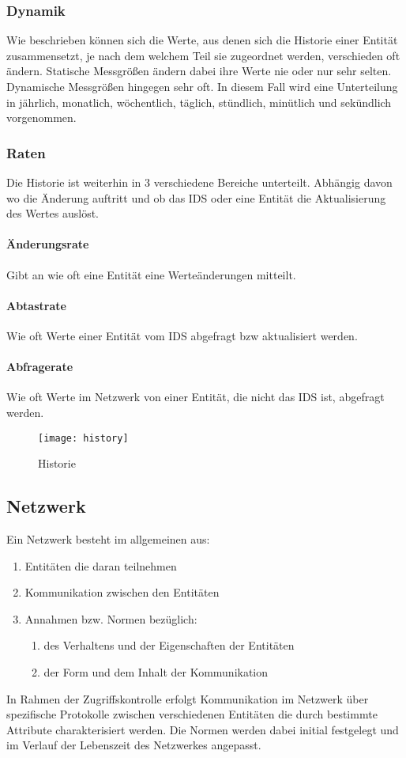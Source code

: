 \subsubsection{Dynamik}
Wie 
 beschrieben können sich die Werte, aus denen sich die Historie einer Entität zusammensetzt, je nach dem welchem Teil sie zugeordnet werden, verschieden oft ändern.
Statische Messgrößen ändern dabei ihre Werte nie oder nur sehr selten. Dynamische Messgrößen hingegen sehr oft. In diesem Fall wird eine Unterteilung in jährlich, monatlich, wöchentlich, täglich, stündlich, minütlich und sekündlich vorgenommen.
\subsubsection{Raten}
Die Historie ist weiterhin in 3 verschiedene Bereiche unterteilt. Abhängig davon wo die Änderung auftritt und ob das IDS oder eine Entität die Aktualisierung des Wertes auslöst.
\paragraph{Änderungsrate} 
Gibt an wie oft eine Entität eine Werteänderungen mitteilt.
\paragraph{Abtastrate}
Wie oft Werte einer Entität vom IDS abgefragt bzw aktualisiert werden.
\paragraph{Abfragerate}
Wie oft Werte im Netzwerk von einer Entität, die nicht das IDS ist, abgefragt werden.
\begin{figure}[H]
\centering
\texttt{[image: history]}
\caption{Historie}
\end{figure}

\subsection{Netzwerk}
Ein Netzwerk besteht im allgemeinen aus:
\begin{enumerate}
\item{Entitäten die daran teilnehmen}
\item{Kommunikation zwischen den Entitäten}
\item{Annahmen bzw. Normen bezüglich:}
\begin{enumerate}
	\item{des Verhaltens und der Eigenschaften der Entitäten}
	\item{der Form und dem Inhalt der Kommunikation}
\end{enumerate}
\end{enumerate}
In Rahmen der Zugriffskontrolle erfolgt Kommunikation im Netzwerk über spezifische Protokolle zwischen verschiedenen Entitäten die durch bestimmte Attribute charakterisiert werden. Die Normen werden dabei initial festgelegt und im Verlauf der Lebenszeit des Netzwerkes angepasst.  
